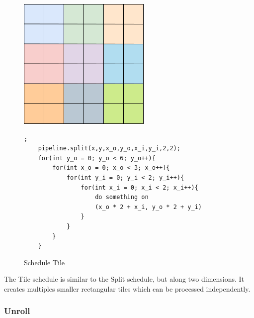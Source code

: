 \begin{figure}[H]

		\begin{minipage}[c]{\EIW}
			\centering
		\includegraphics[width=\textwidth]{Images/Tile.png}
		\end{minipage}
		\begin{minipage}[c]{\ECW}
			\centering
			\begin{lstlisting}[label={code:reorder}];
	pipeline.split(x,y,x_o,y_o,x_i,y_i,2,2);
	for(int y_o = 0; y_o < 6; y_o++){
		for(int x_o = 0; x_o < 3; x_o++){
			for(int y_i = 0; y_i < 2; y_i++){
				for(int x_i = 0; x_i < 2; x_i++){
					do something on
					(x_o * 2 + x_i, y_o * 2 + y_i)
				}
			}
		}
	}
\end{lstlisting}
		\end{minipage}
		\caption{Schedule Tile}
		\label{schedule:tile}
\end{figure}
	The Tile schedule is similar to the Split schedule, but along two dimensions. It creates multiples smaller rectangular tiles which can be processed independently.

	\subsubsection{Unroll}


